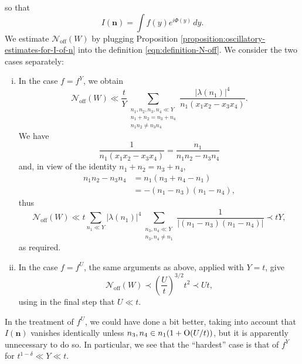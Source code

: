 \documentclass[reqno]{amsart} 
\begin{document}
so that
\begin{equation*}
  I(\mathbf{n}) = \int f(y) e ^{i \Phi(y) } \, d y.
\end{equation*}
We estimate $\mathcal{N}_{\mathrm{off}}(W)$ by plugging Proposition \ref{proposition:oscillatory-estimates-for-I-of-n} into the definition \eqref{eqn:definition-N-off}.  We consider the two cases separately:
\begin{enumerate}[(i)]
\item In the case $f = f^Y$, we obtain
  \begin{equation*}
  \mathcal{N} _{\mathrm{off}} (W) \ll
  \frac{t}{Y}
  \sum _{
    \substack{
      n _1, n _2, n _3, n _4 \ll Y  \\
      n _1 + n _2 = n _3  +  n_4  \\
      n _1 n _2 \neq n _3 n _4 
    }
  }
  \frac{\left\lvert \lambda (n _1 ) \right\rvert ^4 }{n_1 (x_1 x_2 - x_3 x_4) }.
\end{equation*}
We have
\begin{equation*}
  \frac{1}{ n _1  (x _1 x _2 - x _3 x _4 )}
  =
  \frac{n_1}{ n _1 n _2 - n _3 n _4 }
\end{equation*}
and, in view of the identity $n_1 + n_2 = n_3 + n_4$,
\begin{align*}
  n _1 n _2 - n _3  n _4 &=
                           n_1 (n_3 + n_4 - n_1) \\
                         &=
                           - (n _1 - n _3 ) (n _1 - n _4 ),
\end{align*}
thus
\begin{equation*}
  \mathcal{N} _{\mathrm{off}} (W) \ll
  t
  \sum _{n _1 \ll Y} \left\lvert \lambda(n_1) \right\rvert^4
  \sum _{
    \substack{
      n_3, n_4 \ll Y  \\
      n_3, n_4 \neq n_1      
    }
  }
  \frac{1}{|(n_1 - n_3)(n_1 - n_4)|} \prec t Y,
\end{equation*}
as required.
\item In the case $f = f^U$, the same arguments as above, applied with $Y = t$, give
  \begin{equation*}
    \mathcal{N} _{\mathrm{off}} (W) \prec \left( \frac{U}{t} \right) ^{3/2} t^2 \prec U t,
  \end{equation*}
  using in the final step that $U \ll t$.
\end{enumerate}
\begin{remark}\label{remark:cqx50a2ssj}
  In the treatment of $f^U$, we could have done a bit better, taking into account that $I(\mathbf{n})$ vanishes identically unless $n_3, n_4 \in  n _1 (1 + \operatorname{O}(U/t))$, but it is apparently unnecessary to do so.  In particular, we see that the ``hardest'' case is that of $f^Y$ for $t^{1-\delta} \ll Y \ll t$.
\end{remark}
\end{document}
